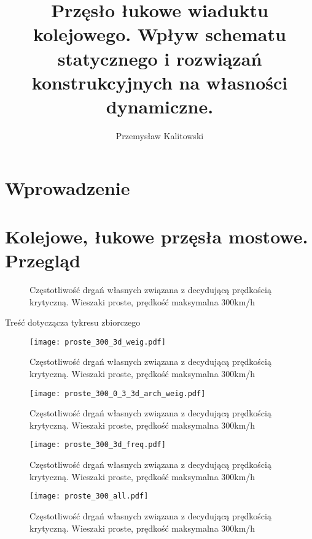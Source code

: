 
\title{Przęsło łukowe wiaduktu kolejowego. Wpływ schematu statycznego i rozwiązań konstrukcyjnych na własności dynamiczne.}
\author{Przemysław Kalitowski}


\maketitle

\tableofcontents






\chapter*{Wprowadzenie}
\chapter{Kolejowe, łukowe przęsła mostowe. Przegląd}



\begin{figure}[h]
	\centering
	\captionsetup{justification=centering}
	\caption{Częstotliwość drgań własnych związana z decydującą prędkością krytyczną. Wieszaki proste, prędkość maksymalna 300km/h}
\end{figure}
Treść dotyczącza tykresu zbiorczego 
\begin{figure}[h]
	\centering
	\texttt{[image: proste\_300\_3d\_weig.pdf]}
	\captionsetup{justification=centering}
	\caption{Częstotliwość drgań własnych związana z decydującą prędkością krytyczną. Wieszaki proste, prędkość maksymalna 300km/h}
\end{figure}
\begin{figure}[h]
	\centering
	\texttt{[image: proste\_300\_0\_3\_3d\_arch\_weig.pdf]}
	\captionsetup{justification=centering}
	\caption{Częstotliwość drgań własnych związana z decydującą prędkością krytyczną. Wieszaki proste, prędkość maksymalna 300km/h}
\end{figure}
\begin{figure}[h]
	\centering
	\texttt{[image: proste\_300\_3d\_freq.pdf]}
	\captionsetup{justification=centering}
	\caption{Częstotliwość drgań własnych związana z decydującą prędkością krytyczną. Wieszaki proste, prędkość maksymalna 300km/h}
\end{figure}
\begin{figure}[h]
	\centering
	\texttt{[image: proste\_300\_all.pdf]}
	\captionsetup{justification=centering}
	\caption{Częstotliwość drgań własnych związana z decydującą prędkością krytyczną. Wieszaki proste, prędkość maksymalna 300km/h}
\end{figure}









